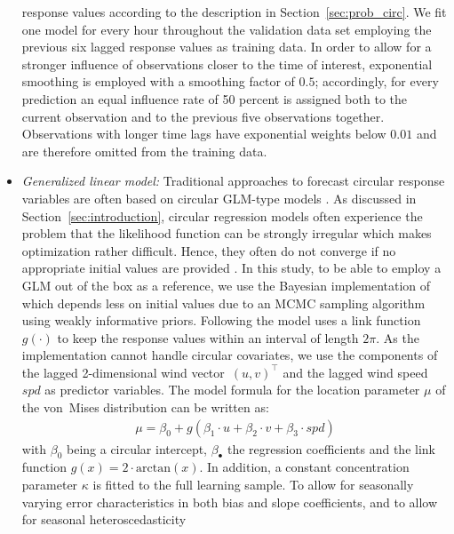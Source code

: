 \documentclass{statsoc}
\begin{document}
\begin{itemize}
    response values according to the description in Section~\ref{sec:prob_circ}.
    We fit one model for every hour throughout the validation data set employing
    the previous six lagged response values as training data. In order to allow for
    a stronger influence of observations closer to the time of interest,
    exponential smoothing is employed with a smoothing factor of $0.5$;
    accordingly, for every prediction an equal influence rate of 50 percent is
    assigned both to the current observation and to the previous five observations
    together. Observations with longer time lags have exponential weights below
    $0.01$ and are therefore omitted from the training data.
  \item \emph{Generalized linear model:}
    Traditional approaches to forecast circular response variables are often
    based on circular GLM-type models \citep{Fisher:1993}. As discussed in
    Section~\ref{sec:introduction}, circular regression models often experience the
    problem that the likelihood function can be strongly irregular which makes
    optimization rather difficult. Hence, they often do not converge if no
    appropriate initial values are provided \citep{Pewsey+Neuhaeuser+Ruxton:2013,
    Gill+Hangartner:2010}. In this study, to be able to employ a GLM out of the box
    as a reference, we use the Bayesian implementation of
    \cite{Mulder+Klugkist:2017} which depends less on initial values due to an MCMC
    sampling algorithm using weakly informative priors.  \newline Following
    \cite{Mulder+Klugkist:2017} the model uses a link function~$g(\cdot)$ to keep the
    response values within an interval of length $2\pi$. As the implementation
    cannot handle circular covariates, we use the components of the lagged
    2-dimensional wind vector~$(u, v)^{\top}$ and the lagged
    wind speed $spd$ as predictor variables. The model formula for the location
    parameter $\mu$ of the von~Mises distribution can be written as:
    \begin{align}
      \mu = \beta_0 + g(\beta_1 \cdot u + \beta_2 \cdot v + \beta_3 \cdot spd)
    \end{align}
    with $\beta_0$ being a circular intercept, $\beta_\bullet$ the regression
    coefficients and the link function $g(x) = 2 \cdot \text{arctan}(x)$. In
    addition, a constant concentration parameter $\kappa$ is fitted to the full
    learning sample. To allow for seasonally varying error characteristics in both
    bias and slope coefficients, and to allow for seasonal heteroscedasticity

\end{itemize}
\end{document}
